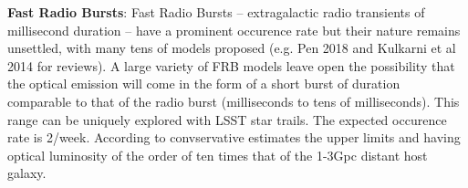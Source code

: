 \documentclass[12pt, letterpaper]{article}
\begin{document}

{\bf Fast Radio Bursts}: Fast Radio Bursts – extragalactic radio transients of millisecond duration – have a prominent occurence rate but their nature remains unsettled, with many tens of models proposed (e.g. Pen 2018 and Kulkarni et al 2014 for reviews). A large variety of FRB models leave open the possibility that the optical emission will come in the form of a short burst of duration comparable to that of the radio burst (milliseconds to tens of milliseconds). This range can be uniquely explored with LSST star trails. The expected occurence rate is 2/week. According to convservative estimates the upper limits and having optical luminosity of the order of ten times that of the 1-3Gpc distant host galaxy.


\end{document}
